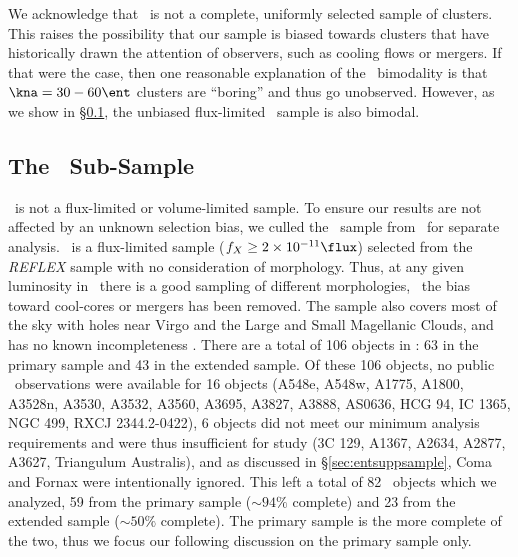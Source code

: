 We acknowledge that \accept\ is not a complete, uniformly selected
sample of clusters. This raises the possibility that our sample is
biased towards clusters that have historically drawn the attention of
observers, such as cooling flows or mergers. If that were the case,
then one reasonable explanation of the \kna\ bimodality is that $\kna
= 30-60 \ent$ clusters are ``boring'' and thus go unobserved. However,
as we show in \S\ref{sec:entsupphifl}, the unbiased flux-limited
\hifl\ sample is also bimodal.

\subsection{The \hifl\ Sub-Sample}
\label{sec:entsupphifl}

\accept\ is not a flux-limited or volume-limited sample. To ensure our
results are not affected by an unknown selection bias, we culled the
\hifl\ sample from \accept\ for separate analysis. \hifl\ is a
flux-limited sample ($f_X \ge 2 \times 10^{-11} \flux$) selected from
the {\it{REFLEX}} sample \citep{reflex} with no consideration of
morphology. Thus, at any given luminosity in \hifl\ there is a good
sampling of different morphologies, \ie\ the bias toward cool-cores or
mergers has been removed. The sample also covers most of the sky with
holes near Virgo and the Large and Small Magellanic Clouds, and has no
known incompleteness \citep{2007A&A...466..805C}. There are a total of
106 objects in \hifl: 63 in the primary sample and 43 in the extended
sample. Of these 106 objects, no public \chandra\ observations were
available for 16 objects (A548e, A548w, A1775, A1800, A3528n, A3530,
A3532, A3560, A3695, A3827, A3888, AS0636, HCG 94, IC 1365, NGC 499,
RXCJ 2344.2-0422), 6 objects did not meet our minimum analysis
requirements and were thus insufficient for study (3C 129, A1367,
A2634, A2877, A3627, Triangulum Australis), and as discussed in
\S\ref{sec:entsuppsample}, Coma and Fornax were intentionally ignored. This
left a total of 82
\hifl\ objects which we analyzed, 59 from the primary sample ($\sim
94\%$ complete) and 23 from the extended sample ($\sim 50\%$
complete). The primary sample is the more complete of the two, thus we
focus our following discussion on the primary sample only.

